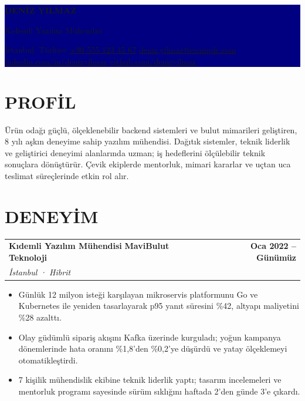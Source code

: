 \documentclass[10pt,a4paper]{article}
\makeatletter
\newcommand{\contactsep}{\hspace{0.55em}\textcolor{rulegray}{\textbullet}\hspace{0.55em}}
\newcommand{\role}[4]{%
  \begin{tabularx}{\textwidth}{@{}Xr@{}}
    \textbf{\color{navy}#1} \enspace \textcolor{muted}{\textbar} \enspace \textbf{#2} &
    \textcolor{slate}{\textbf{#3}} \\
    \textit{\color{muted}#4} &
  \end{tabularx}\vspace{-3pt}
}
\makeatother
\begin{document}
\begingroup
\setlength{\fboxsep}{0pt}
\colorbox{navy}{%
  \parbox{\dimexpr\textwidth\relax}{%
    \vspace{9pt}
    \centering
    {\fontsize{25}{28}\selectfont\bfseries\color{white}DENİZ YILMAZ}\par
    \vspace{2pt}
    {\large\color{white!88}Kıdemli Yazılım Mühendisi}\par
    \vspace{7pt}
    {\footnotesize\color{white!94}
      İstanbul, Türkiye
      \contactsep
      \href{tel:+905551234567}{\textcolor{white!94}{+90 555 123 45 67}}
      \contactsep
      \href{mailto:deniz.yilmaz@example.com}{\textcolor{white!94}{deniz.yilmaz@example.com}}
      \contactsep
      \href{https://www.linkedin.com/in/denizyilmaz}{\textcolor{white!94}{linkedin.com/in/denizyilmaz}}
      \contactsep
      \href{https://github.com/denizyilmaz}{\textcolor{white!94}{github.com/denizyilmaz}}
    }\par
    \vspace{9pt}
  }%
}
\endgroup

\section*{PROFİL}
Ürün odağı güçlü, ölçeklenebilir backend sistemleri ve bulut mimarileri geliştiren, 8 yılı aşkın deneyime sahip yazılım mühendisi. Dağıtık sistemler, teknik liderlik ve geliştirici deneyimi alanlarında uzman; iş hedeflerini ölçülebilir teknik sonuçlara dönüştürür. Çevik ekiplerde mentorluk, mimari kararlar ve uçtan uca teslimat süreçlerinde etkin rol alır.

\section*{DENEYİM}
\role{Kıdemli Yazılım Mühendisi}{MaviBulut Teknoloji}{Oca 2022 -- Günümüz}{İstanbul · Hibrit}
\begin{itemize}
  \item Günlük 12 milyon isteği karşılayan mikroservis platformunu Go ve Kubernetes ile yeniden tasarlayarak p95 yanıt süresini \%42, altyapı maliyetini \%28 azalttı.
  \item Olay güdümlü sipariş akışını Kafka üzerinde kurguladı; yoğun kampanya dönemlerinde hata oranını \%1,8'den \%0,2'ye düşürdü ve yatay ölçeklemeyi otomatikleştirdi.
  \item 7 kişilik mühendislik ekibine teknik liderlik yaptı; tasarım incelemeleri ve mentorluk programı sayesinde sürüm sıklığını haftada 2'den günde 3'e çıkardı.
\end{itemize}
\end{document}
